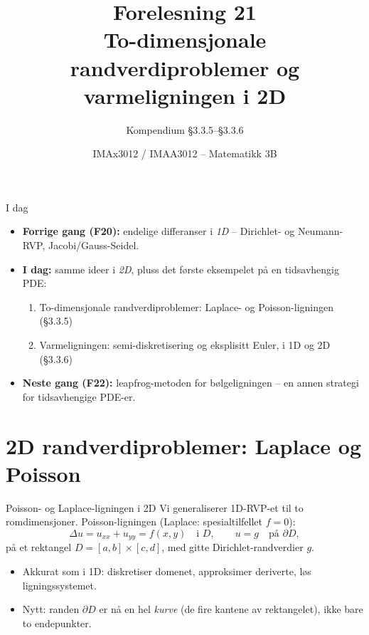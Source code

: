 \documentclass[11pt,aspectratio=169]{beamer}
\title[F21 -- 2D Randverdiproblemer]{Forelesning 21\\ To-dimensjonale randverdiproblemer og varmeligningen i 2D}
\subtitle{Kompendium §3.3.5--§3.3.6}
\author{IMAx3012 / IMAA3012 -- Matematikk 3B}
\date{}
\begin{document}
\begin{frame}
\titlepage
\end{frame}

\begin{frame}{I dag}
\begin{itemize}
\item \textbf{Forrige gang (F20):} endelige differanser i \emph{1D} -- Dirichlet- og Neumann-RVP, Jacobi/Gauss-Seidel.
\item \textbf{I dag:} samme ideer i \emph{2D}, pluss det første eksempelet på en tidsavhengig PDE:
  \begin{enumerate}
  \item To-dimensjonale randverdiproblemer: Laplace- og Poisson-ligningen (§3.3.5)
  \item Varmeligningen: semi-diskretisering og eksplisitt Euler, i 1D og 2D (§3.3.6)
  \end{enumerate}
\item \textbf{Neste gang (F22):} leapfrog-metoden for bølgeligningen -- en annen strategi for tidsavhengige PDE-er.
\end{itemize}
\end{frame}

\section{2D randverdiproblemer: Laplace og Poisson}

\begin{frame}{Poisson- og Laplace-ligningen i 2D}
Vi generaliserer 1D-RVP-et til to romdimensjoner. Poisson-ligningen (Laplace: spesialtilfellet $f=0$):
\[
\Delta u = u_{xx}+u_{yy} = f(x,y) \quad \text{i } D, \qquad u=g \quad \text{på } \partial D,
\]
på et rektangel $D=[a,b]\times[c,d]$, med gitte Dirichlet-randverdier $g$.
\begin{itemize}
\item Akkurat som i 1D: diskretiser domenet, approksimer deriverte, løs ligningssystemet.
\item Nytt: randen $\partial D$ er nå en hel \emph{kurve} (de fire kantene av rektangelet), ikke bare to endepunkter.
\end{itemize}
\end{frame}
\end{document}
